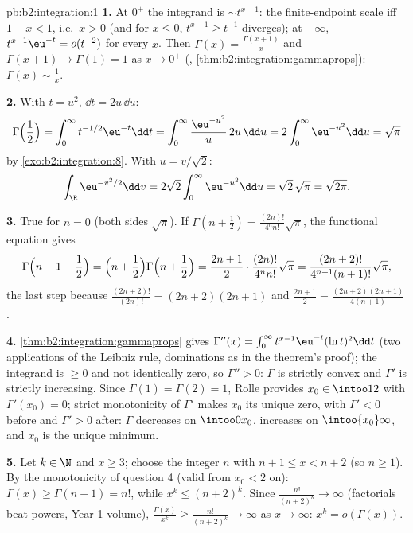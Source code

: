 \begin{solution}{pb:b2:integration:1}
\textbf{1.} At $0^+$ the integrand is $\sim t^{x-1}$: the
finite-endpoint scale  iff $1 - x < 1$, i.e.\ $x > 0$
(and for $x \leq 0$, $t^{x-1} \geq t^{-1}$ diverges); at
$+\infty$, $t^{x-1}\eu^{-t} = o(t^{-2})$  for every
$x$. Then $\Gamma(x) = \frac{\Gamma(x+1)}{x}$ and $\Gamma(x+1)
\to \Gamma(1) = 1$ as $x \to 0^+$ (,
\cref{thm:b2:integration:gammaprops}): $\Gamma(x) \sim
\frac1x$.

\textbf{2.} With $t = u^2$, $\dd t = 2u\,\dd u$:
\[
\Gamma\Bigl(\frac12\Bigr) = \int_0^\infty
t^{-1/2}\eu^{-t}\dd t
= \int_0^\infty \frac{\eu^{-u^2}}{u}\,2u\,\dd u
= 2\int_0^\infty \eu^{-u^2}\dd u = \sqrt\pi
\]
by \cref{exo:b2:integration:8}. With $u = v/\sqrt2$:
\[
\int_\R \eu^{-v^2/2}\dd v
= 2\sqrt2\int_0^\infty \eu^{-u^2}\dd u
= \sqrt2\,\sqrt\pi = \sqrt{2\pi} .
\]

\textbf{3.} True for $n = 0$ (both sides $\sqrt\pi$). If
$\Gamma(n + \frac12) = \frac{(2n)!}{4^n n!}\sqrt\pi$, the
functional equation gives
\[
\Gamma\Bigl(n + 1 + \frac12\Bigr)
= \Bigl(n + \frac12\Bigr)\Gamma\Bigl(n + \frac12\Bigr)
= \frac{2n+1}{2}\cdot\frac{(2n)!}{4^n n!}\sqrt\pi
= \frac{(2n+2)!}{4^{n+1}(n+1)!}\sqrt\pi ,
\]
the last step because $\frac{(2n+2)!}{(2n)!} = (2n+2)(2n+1)$
and $\frac{2n+1}{2} = \frac{(2n+2)(2n+1)}{4(n+1)}$.

\textbf{4.} \cref{thm:b2:integration:gammaprops} gives
$\Gamma''(x) = \int_0^\infty t^{x-1}\eu^{-t}(\ln t)^2\dd t$
(two applications of the Leibniz rule, dominations as in the
theorem's proof); the integrand is $\geq 0$ and not identically
zero, so $\Gamma'' > 0$: $\Gamma$ is strictly convex and
$\Gamma'$ is strictly increasing. Since $\Gamma(1) = \Gamma(2)
= 1$, Rolle provides $x_0 \in \intoo12$ with $\Gamma'(x_0) =
0$; strict monotonicity of $\Gamma'$ makes $x_0$ its unique
zero, with $\Gamma' < 0$ before and $\Gamma' > 0$ after:
$\Gamma$ decreases on $\intoo0{x_0}$, increases on
$\intoo{x_0}\infty$, and $x_0$ is the unique minimum.

\textbf{5.} Let $k \in \N$ and $x \geq 3$; choose the integer
$n$ with $n + 1 \leq x < n + 2$ (so $n \geq 1$). By the
monotonicity of question 4 (valid from $x_0 < 2$ on): $\Gamma(x)
\geq \Gamma(n + 1) = n!$, while $x^k \leq (n+2)^k$. Since
$\frac{n!}{(n+2)^k} \to \infty$ (factorials beat powers, Year 1
volume), $\frac{\Gamma(x)}{x^k} \geq \frac{n!}{(n+2)^k} \to
\infty$ as $x \to \infty$: $x^k = o(\Gamma(x))$.


\end{solution}
